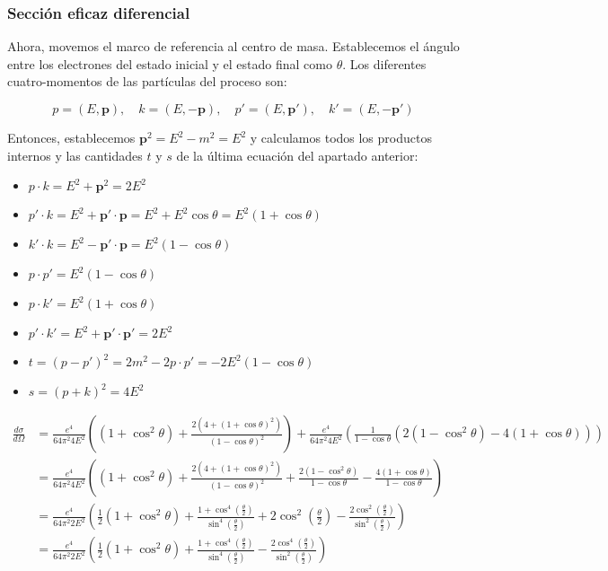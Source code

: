 \subsubsection{Sección eficaz diferencial}
Ahora, movemos el marco de referencia al centro de masa. Establecemos el ángulo entre los electrones del estado inicial y el estado final como $\theta$. Los diferentes cuatro-momentos de las partículas del proceso son:

\begin{equation}
p = (E, \mathbf{p}), \quad k = (E, -\mathbf{p}), \quad p' = (E, \mathbf{p'}), \quad k' = (E, -\mathbf{p'})
\end{equation}

Entonces, establecemos $\mathbf{p}^2 = E^2 - m^2 = E^2$ y calculamos todos los productos internos y las cantidades $t$ y $s$ de la última ecuación del apartado anterior:

\begin{itemize}
    \item $ p \cdot k = E^2 + \mathbf{p}^2 = 2E^2 $
    \item $ p' \cdot k = E^2 + \mathbf{p'} \cdot \mathbf{p} = E^2 + E^2 \cos \theta = E^2 (1 + \cos \theta) $
    \item $ k' \cdot k = E^2 - \mathbf{p'} \cdot \mathbf{p} = E^2 (1 - \cos \theta) $
    \item $ p \cdot p' = E^2 (1 - \cos \theta) $
    \item $ p \cdot k' = E^2 (1 + \cos \theta) $
    \item $ p' \cdot k' = E^2 + \mathbf{p'} \cdot \mathbf{p'} = 2E^2 $
    \item $ t = (p - p')^2 = 2m^2 - 2p \cdot p' = -2E^2(1 - \cos \theta) $
    \item $ s = (p + k)^2 = 4E^2 $
\end{itemize}


\begin{equation}
  \begin{aligned}
  \frac{d \sigma}{d \Omega} & =\frac{e^4}{64 \pi^2 4 E^2}\left(\left(1+\cos ^2 \theta\right)+\frac{2\left(4+(1+\cos \theta)^2\right)}{(1-\cos \theta)^2}\right)+\frac{e^4}{64 \pi^2 4 E^2}\left(\frac{1}{1-\cos \theta}\left(2\left(1-\cos ^2 \theta\right)-4(1+\cos \theta)\right)\right) \\
  & =\frac{e^4}{64 \pi^2 4 E^2}\left(\left(1+\cos ^2 \theta\right)+\frac{2\left(4+(1+\cos \theta)^2\right)}{(1-\cos \theta)^2}+\frac{2\left(1-\cos ^2 \theta\right)}{1-\cos \theta}-\frac{4(1+\cos \theta)}{1-\cos \theta}\right) \\
  & =\frac{e^4}{64 \pi^2 2 E^2}\left(\frac{1}{2}\left(1+\cos ^2 \theta\right)+\frac{1+\cos ^4\left(\frac{\theta}{2}\right)}{\sin ^4\left(\frac{\theta}{2}\right)}+2 \cos ^2\left(\frac{\theta}{2}\right)-\frac{2 \cos ^2\left(\frac{\theta}{2}\right)}{\sin ^2\left(\frac{\theta}{2}\right)}\right) \\
  & =\frac{e^4}{64 \pi^2 2 E^2}\left(\frac{1}{2}\left(1+\cos ^2 \theta\right)+\frac{1+\cos ^4\left(\frac{\theta}{2}\right)}{\sin ^4\left(\frac{\theta}{2}\right)}-\frac{2 \cos ^4\left(\frac{\theta}{2}\right)}{\sin ^2\left(\frac{\theta}{2}\right)}\right)
  \end{aligned}
  \end{equation}
